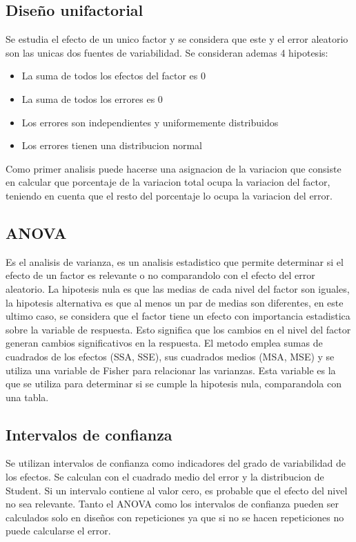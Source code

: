 \documentclass[a4paper]{article}
\begin{document}
\subsection*{Diseño unifactorial}
Se estudia el efecto de un unico factor y se considera que este y el error aleatorio son las unicas dos fuentes de
variabilidad.
Se consideran ademas 4 hipotesis:
\begin{itemize}
    \item La suma de todos los efectos del factor es 0
    \item La suma de todos los errores es 0
    \item Los errores son independientes y uniformemente distribuidos
    \item Los errores tienen una distribucion normal
\end{itemize}
Como primer analisis puede hacerse una asignacion de la variacion que consiste en calcular que porcentaje de 
la variacion total ocupa la variacion del factor, teniendo en cuenta que el resto del porcentaje lo ocupa 
la variacion del error.

\subsection*{ANOVA}
Es el analisis de varianza, es un analisis estadistico que permite determinar si el efecto de un factor es 
relevante o no comparandolo con el efecto del error aleatorio.
La hipotesis nula es que las medias de cada nivel del factor son iguales, la hipotesis alternativa es que 
al menos un par de medias son diferentes, en este ultimo caso, se considera que el factor tiene un efecto con 
importancia estadistica sobre la variable de respuesta. Esto significa que los cambios en el nivel del factor 
generan cambios significativos en la respuesta.
El metodo emplea sumas de cuadrados de los efectos (SSA, SSE), sus cuadrados medios (MSA, MSE) y se utiliza una 
variable de Fisher para relacionar las varianzas. Esta variable es la que se utiliza para determinar si se 
cumple la hipotesis nula, comparandola con una tabla.

\subsection*{Intervalos de confianza}
Se utilizan intervalos de confianza como indicadores del grado de variabilidad de los efectos.
Se calculan con el cuadrado medio del error y la distribucion de Student. Si un intervalo 
contiene al valor cero, es probable que el efecto del nivel no sea relevante.
Tanto el ANOVA como los intervalos de confianza pueden ser calculados solo en diseños con
repeticiones ya que si no se hacen repeticiones no puede calcularse el error.
\end{document}
